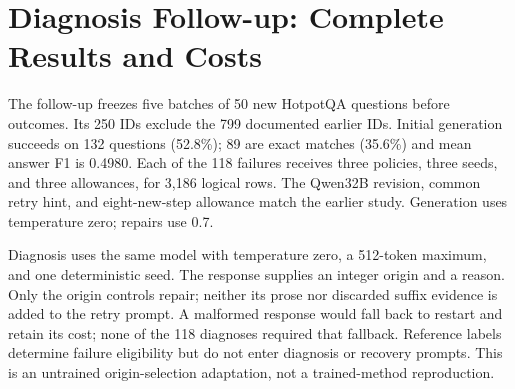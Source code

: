 \documentclass{article}
\begin{document}
\section{Diagnosis Follow-up: Complete Results and Costs}\label{app:diagnosis_followup}
The follow-up freezes five batches of 50 new HotpotQA questions before
outcomes. Its 250 IDs exclude the 799 documented earlier IDs. Initial
generation succeeds on 132 questions (52.8\%); 89 are exact matches
(35.6\%) and mean answer F1 is 0.4980. Each of the 118 failures receives
three policies, three seeds, and three allowances, for 3,186 logical rows.
The Qwen32B revision, common retry hint, and eight-new-step allowance match
the earlier study. Generation uses temperature zero; repairs use 0.7.

\begin{table}[ht]
\centering\small
\caption{Separate diagnosis follow-up. Each policy/allowance has 354 seed
trials on the same 118 initial failures. Success is answer EM or F1 at least
0.5. EM and F1 retain that failure cohort.}
\label{tab:diagnosis_results}

\end{table}

\begin{table}[ht]
\centering\small
\caption{Uncertainty minus control in the diagnosis follow-up. Intervals
are individual, unadjusted 95\% question-bootstrap intervals (10,000
resamples). All six two-sided question sign-flip tests share one Holm family.}
\label{tab:diagnosis_contrasts}

\end{table}

Diagnosis uses the same model with temperature zero, a 512-token maximum,
and one deterministic seed. The response supplies an integer origin and
a reason. Only the origin controls repair; neither its prose nor discarded
suffix evidence is added to the retry prompt. A malformed response would
fall back to restart and retain its cost; none of the 118 diagnoses required
that fallback. Reference labels determine failure eligibility but do not
enter diagnosis or recovery prompts. This is an untrained origin-selection
adaptation, not a trained-method reproduction.

\begin{table}[ht]
\centering\small
\caption{Mean incremental resource use per standalone recovery attempt,
including a complete diagnosis charge for diagnosis/replay. Generated-token
allowances apply to recovery; prompt processing and diagnosis add cost.}
\label{tab:diagnosis_costs}

\end{table}
\end{document}
